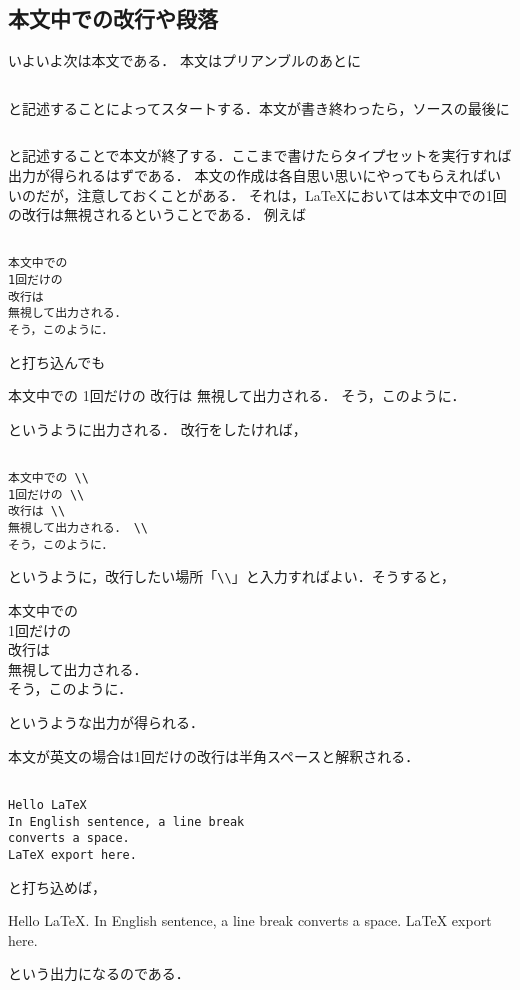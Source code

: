 \subsection{本文中での改行や段落}
いよいよ次は本文である．
本文はプリアンブルのあとに
\begin{verbatim}

\end{verbatim}
と記述することによってスタートする．本文が書き終わったら，ソースの最後に
\begin{verbatim}

\end{verbatim}
と記述することで本文が終了する．ここまで書けたらタイプセットを実行すれば出力が得られるはずである．
本文の作成は各自思い思いにやってもらえればいいのだが，注意しておくことがある．
それは，{\LaTeX}においては本文中での1回の改行は無視されるということである．
例えば
\begin{verbatim}

本文中での
1回だけの
改行は
無視して出力される．
そう，このように．

\end{verbatim}
と打ち込んでも
\begin{framed}
本文中での
1回だけの
改行は
無視して出力される．
そう，このように．
\end{framed}
というように出力される．
改行をしたければ，
\begin{verbatim}

本文中での \\
1回だけの \\
改行は \\
無視して出力される． \\
そう，このように．

\end{verbatim}
というように，改行したい場所「\verb|\\|」と入力すればよい．そうすると，
\begin{framed}
本文中での \\
1回だけの \\
改行は \\
無視して出力される． \\
そう，このように．
\end{framed}
というような出力が得られる．

本文が英文の場合は1回だけの改行は半角スペースと解釈される．
\begin{verbatim}

Hello LaTeX
In English sentence, a line break 
converts a space.
LaTeX export here.

\end{verbatim}
と打ち込めば，
\begin{framed}
Hello LaTeX.
In English sentence, a line break 
converts a space.
LaTeX export here.
\end{framed}
という出力になるのである．

